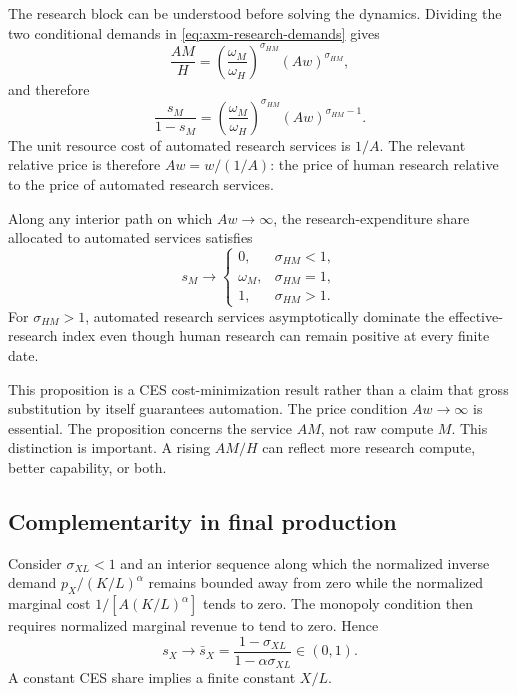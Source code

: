 The research block can be understood before solving the dynamics. Dividing the
two conditional demands in \eqref{eq:axm-research-demands} gives
\begin{equation}
 \frac{AM}{H}
 =\left(\frac{\omega_M}{\omega_H}\right)^{\sigma_{HM}}
  (Aw)^{\sigma_{HM}},
 \label{eq:axm-input-ratio}
\end{equation}
and therefore
\begin{equation}
 \frac{s_M}{1-s_M}
 =\left(\frac{\omega_M}{\omega_H}\right)^{\sigma_{HM}}
  (Aw)^{\sigma_{HM}-1}.
 \label{eq:axm-automation-odds}
\end{equation}
The unit resource cost of automated research services is \(1/A\). The relevant
relative price is therefore \(Aw=w/(1/A)\): the price of human research relative
to the price of automated research services.

\begin{proposition}
\label{prop:axm-research-automation}
Along any interior path on which \(Aw\to\infty\), the research-expenditure share
allocated to automated services satisfies
\[
 s_M\to
 \begin{cases}
  0,&\sigma_{HM}<1,\\
  \omega_M,&\sigma_{HM}=1,\\
  1,&\sigma_{HM}>1.
 \end{cases}
\]
For \(\sigma_{HM}>1\), automated research services asymptotically dominate the
effective-research index even though human research can remain positive at every
finite date.
\end{proposition}

This proposition is a CES cost-minimization result rather than a claim that gross
substitution by itself guarantees automation. The price condition
\(Aw\to\infty\) is essential.
The proposition concerns the service \(AM\), not raw compute \(M\). This
distinction is important. A rising \(AM/H\) can reflect more research compute,
better capability, or both.

\subsection{Complementarity in final production}

Consider \(\sigma_{XL}<1\) and an interior sequence along which the normalized
inverse demand \(p_X/(K/L)^\alpha\) remains bounded away from zero while the
normalized marginal cost \(1/[A(K/L)^\alpha]\) tends to zero. The monopoly
condition then requires normalized marginal revenue to tend to zero. Hence
\begin{equation}
 s_X\longrightarrow
 \bar s_X=\frac{1-\sigma_{XL}}{1-\alpha\sigma_{XL}}\in(0,1).
 \label{eq:axm-complement-share}
\end{equation}
A constant CES share implies a finite constant \(X/L\).

